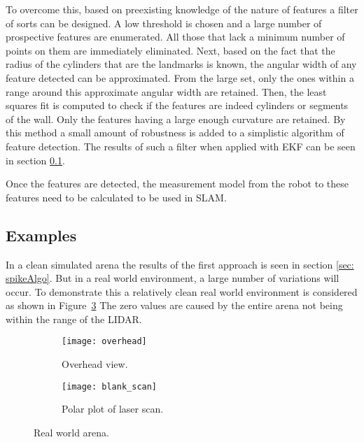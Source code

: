 To overcome this, based on preexisting knowledge of the nature of features a filter of sorts can be designed. A low threshold is chosen and a large number of prospective features are enumerated. All those that lack a minimum number of points on them are immediately eliminated. Next, based on the fact that the radius of the cylinders that are the landmarks is known, the angular width of any feature detected can be approximated. From the large set, only the ones within a range around this approximate angular width are retained. Then, the least squares fit is computed to check if the features are indeed cylinders or segments of the wall. Only the features having a large enough curvature are retained. By this method a small amount of robustness is added to a simplistic algorithm of feature detection. The results of such a filter when applied with EKF can be seen in section \ref{sec:Spike_results}.

Once the features are detected, the measurement model from the robot to these features need to be calculated to be used in \ekf SLAM.

\subsection{Examples}
\label{sec:Spike_results}

In a clean simulated arena the results of the first approach is seen in section \ref{sec: spikeAlgo}. But in a real world environment, a large number of variations will occur. To demonstrate this a relatively clean real world environment is considered as shown in Figure~\ref{fig:Real world arena} The zero values are caused by the entire arena not being within the range of the LIDAR. 
\begin{figure}[h!]
    \centering
    \begin{subfigure}[b]{0.45\textwidth}
    
	    \texttt{[image: overhead]}
	    \caption{Overhead view.}
	    \label{fig:overhead}
    \end{subfigure}
    \quad %
    \begin{subfigure}[b]{0.45\textwidth}
        \texttt{[image: blank\_scan]}
        \caption{Polar plot of laser scan.}
        \label{fig:spike_scan}
    \end{subfigure}%
        \caption{Real world arena.}
        \label{fig:Real world arena}
\end{figure}

